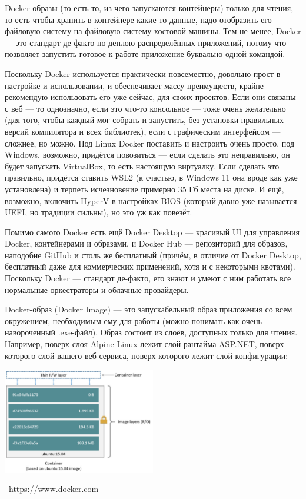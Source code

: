 \documentclass[a5paper]{article}
\newcommand{\attribution}[1] {
    \vspace{-5mm}\begin{flushright}\begin{scriptsize}\textcolor{gray}{\textcopyright\, #1}\end{scriptsize}\end{flushright}
}
\begin{document}
Docker-образы (то есть то, из чего запускаются контейнеры) только для чтения, то есть чтобы хранить в контейнере какие-то данные, надо отобразить его файловую систему на файловую систему хостовой машины. Тем не менее, Docker --- это стандарт де-факто по деплою распределённых приложений, потому что позволяет запустить готовое к работе приложение буквально одной командой. 

Поскольку Docker используется практически повсеместно, довольно прост в настройке и использовании, и обеспечивает массу преимуществ, крайне рекомендую использовать его уже сейчас, для своих проектов. Если они связаны с веб --- то однозначно, если это что-то консольное --- тоже очень желательно (для того, чтобы каждый мог собрать и запустить, без установки правильных версий компилятора и всех библиотек), если с графическим интерфейсом --- сложнее, но можно. Под Linux Docker поставить и настроить очень просто, под Windows, возможно, придётся повозиться --- если сделать это неправильно, он будет запускать VirtualBox, то есть настоящую виртуалку. Если сделать это правильно, придётся ставить WSL2 (к счастью, в Windows 11 она вроде как уже установлена) и терпеть исчезновение примерно 35 Гб места на диске. И ещё, возможно, включить HyperV в настройках BIOS (который давно уже называется UEFI, но традиции сильны), но это уж как повезёт.

Помимо самого Docker есть ещё Docker Desktop --- красивый UI для управления Docker, контейнерами и образами, и Docker Hub --- репозиторий для образов, наподобие GitHub и столь же бесплатный (причём, в отличие от Docker Desktop, бесплатный даже для коммерческих применений, хотя и с некоторыми квотами). Поскольку Docker --- стандарт де-факто, его знают и умеют с ним работать все нормальные оркестраторы и облачные провайдеры.

Docker-образ (Docker Image) --- это запускабельный образ приложения со всем окружением, необходимым ему для работы (можно понимать как очень навороченный .exe-файл). Образ состоит из слоёв, доступных только для чтения. Например, поверх слоя Alpine Linux лежит слой рантайма ASP.NET, поверх которого слой вашего веб-сервиса, поверх которого лежит слой конфигурации:

\begin{center}
    \includegraphics[width=0.5\textwidth]{dockerLayers.png}
    \attribution{\url{ https://www.docker.com}}
\end{center}
\end{document}
